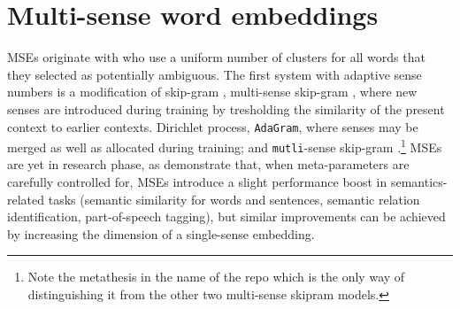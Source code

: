 \documentclass[11pt]{article}
\newcommand{\adagram}{\texttt{AdaGram}}
\newcommand{\mutli}{\texttt{mutli}}
\begin{document}

%



\section{Multi-sense word embeddings}

\todo{}

MSEs originate with \cite{Reisinger:2010,Huang:2012} who use a uniform number
of clusters for all words that they selected as potentially ambiguous.  The
first system with adaptive
sense numbers is a modification of skip-gram \cite{Mikolov:2013d}, multi-sense
skip-gram \citep{Neelakantan:2014}, where new senses are introduced during
training by tresholding the similarity of the present context to earlier
contexts.  Dirichlet process, \adagram \citep{Bartunov:2015}, where senses may
be merged as well as allocated during training; and \mutli-sense skip-gram
\citep{Li:2015}.\footnote{Note the metathesis in the name of the repo which is
the only way of distinguishing it from the other two multi-sense skipram
models.}
MSEs are yet in research phase, as \cite{Li:2015}  demonstrate that, when
meta-parameters are carefully controlled for, MSEs introduce a slight
performance boost in semantics-related tasks (semantic similarity for words and
sentences, semantic relation identification, part-of-speech tagging), but
similar improvements can be achieved by increasing the dimension of a
single-sense embedding.
\end{document}
